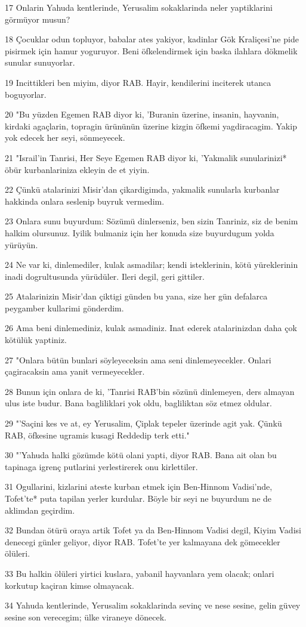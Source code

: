 \par 17 Onlarin Yahuda kentlerinde, Yerusalim sokaklarinda neler yaptiklarini görmüyor musun?
\par 18 Çocuklar odun topluyor, babalar ates yakiyor, kadinlar Gök Kraliçesi'ne pide pisirmek için hamur yoguruyor. Beni öfkelendirmek için baska ilahlara dökmelik sunular sunuyorlar.
\par 19 Incittikleri ben miyim, diyor RAB. Hayir, kendilerini inciterek utanca boguyorlar.
\par 20 "Bu yüzden Egemen RAB diyor ki, 'Buranin üzerine, insanin, hayvanin, kirdaki agaçlarin, topragin ürününün üzerine kizgin öfkemi yagdiracagim. Yakip yok edecek her seyi, sönmeyecek.
\par 21 "Israil'in Tanrisi, Her Seye Egemen RAB diyor ki, 'Yakmalik sunularinizi* öbür kurbanlariniza ekleyin de et yiyin.
\par 22 Çünkü atalarinizi Misir'dan çikardigimda, yakmalik sunularla kurbanlar hakkinda onlara seslenip buyruk vermedim.
\par 23 Onlara sunu buyurdum: Sözümü dinlerseniz, ben sizin Tanriniz, siz de benim halkim olursunuz. Iyilik bulmaniz için her konuda size buyurdugum yolda yürüyün.
\par 24 Ne var ki, dinlemediler, kulak asmadilar; kendi isteklerinin, kötü yüreklerinin inadi dogrultusunda yürüdüler. Ileri degil, geri gittiler.
\par 25 Atalarinizin Misir'dan çiktigi günden bu yana, size her gün defalarca peygamber kullarimi gönderdim.
\par 26 Ama beni dinlemediniz, kulak asmadiniz. Inat ederek atalarinizdan daha çok kötülük yaptiniz.
\par 27 "Onlara bütün bunlari söyleyeceksin ama seni dinlemeyecekler. Onlari çagiracaksin ama yanit vermeyecekler.
\par 28 Bunun için onlara de ki, 'Tanrisi RAB'bin sözünü dinlemeyen, ders almayan ulus iste budur. Bana bagliliklari yok oldu, bagliliktan söz etmez oldular.
\par 29 "'Saçini kes ve at, ey Yerusalim, Çiplak tepeler üzerinde agit yak. Çünkü RAB, öfkesine ugramis kusagi Reddedip terk etti."
\par 30 "'Yahuda halki gözümde kötü olani yapti, diyor RAB. Bana ait olan bu tapinaga igrenç putlarini yerlestirerek onu kirlettiler.
\par 31 Ogullarini, kizlarini ateste kurban etmek için Ben-Hinnom Vadisi'nde, Tofet'te* puta tapilan yerler kurdular. Böyle bir seyi ne buyurdum ne de aklimdan geçirdim.
\par 32 Bundan ötürü oraya artik Tofet ya da Ben-Hinnom Vadisi degil, Kiyim Vadisi denecegi günler geliyor, diyor RAB. Tofet'te yer kalmayana dek gömecekler ölüleri.
\par 33 Bu halkin ölüleri yirtici kuslara, yabanil hayvanlara yem olacak; onlari korkutup kaçiran kimse olmayacak.
\par 34 Yahuda kentlerinde, Yerusalim sokaklarinda sevinç ve nese sesine, gelin güvey sesine son verecegim; ülke viraneye dönecek.

